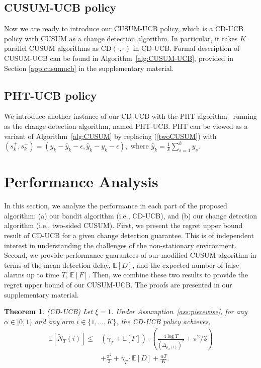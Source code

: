 \documentclass[letterpaper]{article}
\newtheorem{theorem}{Theorem}
\newcommand{\blue}{}
\begin{document}
\subsection{CUSUM-UCB policy}

Now we are ready to introduce our CUSUM-UCB policy, which is a CD-UCB policy with CUSUM as a change detection algorithm. In particular, it takes $K$ parallel CUSUM algorithms as CD$(\cdot,\cdot)$ in CD-UCB. Formal description of CUSUM-UCB can be found in Algorithm~\ref{alg:CUSUM-UCB}, provided in Section \ref{app:cusumucb} in the supplementary material. %

\subsection{PHT-UCB policy}
We introduce another instance of our CD-UCB with the PHT algorithm~\cite{hinkley1971inference} running as the change detection algorithm, named PHT-UCB. PHT can be viewed as a variant of Algorithm~\ref{alg:CUSUM} by replacing (\ref{twoCUSUM}) with $(s_{k}^+,s_{k}^-)=(y_k-\hat{y}_k-\epsilon,\hat{y}_k-y_k-\epsilon),$
where $\hat{y}_k=\frac{1}{k}\sum_{s=1}^ky_s$.
\section{Performance Analysis}\label{sec:analysis}

{In this section, we analyze the performance in each part of the proposed
algorithm: (a) our bandit algorithm (i.e., CD-UCB), and (b) our change
detection algorithm (i.e., two-sided CUSUM).  First, we present the
regret upper bound result of CD-UCB for a given change detection
guarantee.
This is of independent interest in understanding the
challenges of the non-stationary environment.  Second, we provide
performance guarantees of our modified CUSUM algorithm in terms of the
mean detection delay, $\mathbb{E}[D]$, and the expected number of false alarms up to time $T$, $\mathbb{E}[F]$. Then, we combine
these two results to provide the regret upper bound of our CUSUM-UCB.}
{\blue The proofs are presented in our supplementary material.}


\begin{theorem}\label{thm:CD-UCB}
\emph{(CD-UCB)} Let $\xi=1$. Under Assumption~\ref{ass:piecewise}, for any $\alpha\in[0,1)$ and any arm $i\in\{1,\ldots,K\}$, the CD-UCB policy achieves,
\begin{eqnarray}\label{thm1}
\mathbb{E}[\tilde{N}_T(i)]\leq
&\left(\gamma_T+\mathbb{E}[F]\right)\cdot\left(\frac{4\log T}{(\Delta_{\mu_T(i)})^2}+\pi^2/3\right) \\\nonumber
&+\frac{\pi^2}{3}
+\gamma_T\cdot \mathbb{E}[D]+\frac{\alpha T}{K}.
\end{eqnarray}
\end{theorem}
\end{document}

